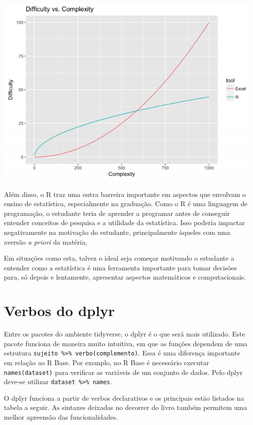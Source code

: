 \documentclass[
]{book}
\begin{document}
\includegraphics{./img/excel_r.PNG}

Além disso, o R traz uma outra barreira importante em aspectos que envolvam o ensino de estatística, especialmente na graduação. Como o R é uma linguagem de programação, o estudante teria de aprender a programar antes de conseguir entender conceitos de pesquisa e a utilidade da estatística. Isso poderia impactar negativamente na motivação do estudante, principalmente àqueles com uma aversão \emph{a priori} da matéria,

Em situações como esta, talvez o ideal seja começar motivando o estudante a entender como a estatística é uma ferramenta importante para tomar decisões para, só depois e lentamente, apresentar aspectos matemáticos e computacionais.

\hypertarget{verbos-do-dplyr}{%
\section{Verbos do dplyr}\label{verbos-do-dplyr}}

Entre os pacotes do ambiente tidyverse, o dplyr é o que será mais utilizado. Este pacote funciona de maneira muito intuitiva, em que as funções dependem de uma estrutura \texttt{sujeito\ \%\textgreater{}\%\ verbo(complemento)}. Essa é uma diferença importante em relação ao R Base. Por exemplo, no R Base é necessário executar \texttt{names(dataset)} para verificar as variáveis de um conjunto de dados. Pelo dplyr deve-se utilizar \texttt{dataset\ \%\textgreater{}\%\ names}.

O dplyr funciona a partir de verbos declarativos e os principais estão listados na tabela a seguir. As sintaxes deixadas no decorrer do livro também permitem uma melhor apreensão das funcionalidades.
\end{document}
